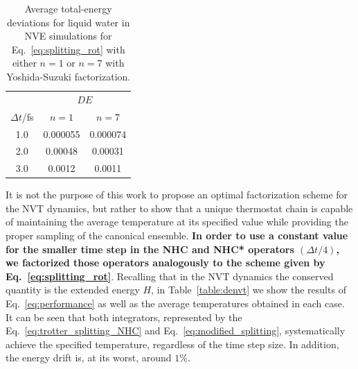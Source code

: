 \documentclass[aip,jcp,reprint,amsmath,amssymb,raggedbottom]{revtex4-1}
\begin{document}
\begin{table}
	\caption{Average total-energy deviations for liquid water in NVE simulations for Eq.~\ref{eq:splitting_rot} with either $n = 1$ or $n = 7$ with Yoshida-Suzuki factorization.}
	\label{table:nve}
	\begin{ruledtabular}
		\begin{tabular}{ccc}
			 & \multicolumn{2}{c}{ $D\!E$ } \\
			 \cline{2-3}
			 $\Delta t$/fs & $n = 1$ & $n = 7$ \\
			 \hline
			 1.0 & 0.000055 & 0.000074 \\
			 2.0 & 0.00048  & 0.00031  \\
			 3.0 & 0.0012   & 0.0011   \\
		\end{tabular}
	\end{ruledtabular}
\end{table}

It is not the purpose of this work to propose an optimal factorization scheme for the NVT dynamics, but rather to show that a unique thermostat chain is capable of maintaining the average temperature at its specified value while providing the proper sampling of the canonical ensemble. \textbf{In order to use a constant value for the smaller time step in the NHC and NHC* operators $(\Delta t/4)$, we factorized those operators analogously to the scheme given by Eq.~\ref{eq:splitting_rot}}. Recalling that in the NVT dynamics the conserved quantity is the extended energy $H$, in Table~\ref{table:denvt} we show the results of Eq.~\ref{eq:performance} as well as the average temperatures obtained in each case. It can be seen that both integrators, represented by the Eq.~\ref{eq:trotter_splitting_NHC} and Eq.~\ref{eq:modified_splitting}, systematically achieve the specified temperature, regardless of the time step size. In addition, the energy drift is, at its worst, around $1 \%$.
\end{document}
